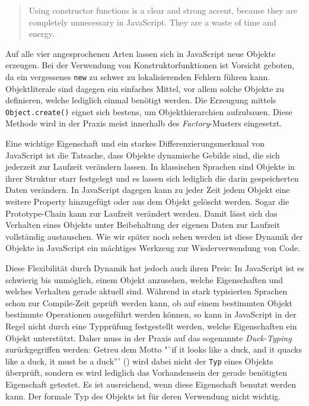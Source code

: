\begin{quote}
Using constructor functions is a clear and strong accent, because
they are completely unnecessary in JavaScript. They are a waste of time and energy.
\citep[p. 51]{ElliottProgrammingJavaScriptapplications2014}
\end{quote}




\skippingparagraph

Auf alle vier angesprochenen Arten lassen sich in JavaScript neue Objekte erzeugen. Bei der Verwendung von Konstruktorfunktionen ist Vorsicht geboten, da ein vergessenes \texttt{new} zu schwer zu lokalisierenden Fehlern führen kann. Objektliterale sind dagegen ein einfaches Mittel, vor allem solche Objekte zu definieren, welche lediglich einmal benötigt werden. Die Erzeugung mittels \texttt{Object.create()} eignet sich bestens, um Objekthierarchien aufzubauen. Diese Methode wird in der Praxis meist innerhalb des \emph{Factory}-Musters eingesetzt. 

Eine wichtige Eigenschaft und ein starkes Differenzierungsmerkmal von JavaScript ist die Tatsache, dass Objekte dynamische Gebilde sind, die sich jederzeit zur Laufzeit verändern lassen. In klassischen Sprachen sind Objekte in ihrer Struktur starr festgelegt und es lassen sich lediglich die darin gespeicherten Daten verändern. In JavaScript dagegen kann zu jeder Zeit jedem Objekt eine weitere Property hinzugefügt oder aus dem Objekt gelöscht werden. Sogar die Prototype-Chain kann zur Laufzeit verändert werden. Damit lässt sich das Verhalten eines Objekts unter Beibehaltung der eigenen Daten zur Laufzeit vollständig austauschen. Wie wir später noch sehen werden ist diese Dynamik der Objekte in JavaScript ein mächtiges Werkzeug zur Wiederverwendung von Code. 

Diese Flexibilität durch Dynamik hat jedoch auch ihren Preis: In JavaScript ist es schwierig bis unmöglich, einem Objekt anzusehen, welche Eigenschaften und welches Verhalten gerade aktuell sind. Während in stark typisierten Sprachen schon zur Compile-Zeit geprüft werden kann, ob auf einem bestimmten Objekt bestimmte Operationen ausgeführt werden können, so kann in JavaScript in der Regel nicht durch eine Typprüfung festgestellt werden, welche Eigenschaften ein Objekt unterstützt. Daher muss in der Praxis auf das sogenannte \emph{Duck-Typing} zurückgegriffen werden: Getreu dem Motto "`if it looks like a duck, and it quacks like a duck, it must be a duck”' (\citep[p. 141]{SimpsonThisobjectprototypes2014}) wird dabei nicht der \texttt{Typ} eines Objekts überprüft, sondern es wird lediglich das Vorhandensein der gerade benötigten Eigenschaft getestet. Es ist ausreichend, wenn diese Eigenschaft benutzt werden kann. Der formale Typ des Objekts ist für deren Verwendung nicht wichtig.



